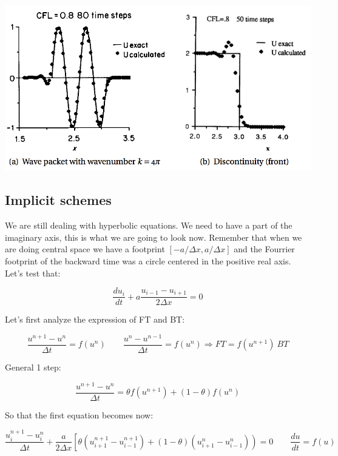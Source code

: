 \begin{center}
\includegraphics[scale=0.5]{ch3/13}
\end{center}

\subsection{Implicit schemes}
We are still dealing with hyperbolic equations. We need to have a part of the imaginary axis, this is what we are going to look now. Remember that when we are doing central space we have a footprint $[-a/\Delta x, a/\Delta x]$ and the Fourrier footprint of the backward time was a circle centered in the positive real axis. Let's test that: 

\begin{equation}
\frac{du_i}{dt} + a \frac{u_{i-1}-u_{i+1}}{2\Delta x} = 0
\end{equation}

Let's first analyze the expression of FT and BT: 

\begin{equation}
\frac{u^{n+1}- u^n}{\Delta t} = f(u^n) \qquad \frac{u^{n}- u^{n-1}}{\Delta t} = f(u^n) \Rightarrow FT = f(u^{n+1})\ BT
\end{equation}

General 1 step: 

\begin{equation}
\frac{u^{n+1}-u^n}{\Delta t} = \theta f(u^{n+1}) + (1-\theta)f(u^n)
\end{equation}

So that the first equation becomes now:

\begin{equation}
\frac{u_i^{n+1}-u_i^n}{\Delta t} + \frac{a}{2\Delta x} \left[ \theta (u_{i+1}^{n+1}-u_{i-1}^{n+1})+ (1-\theta )(u_{i+1}^n - u_{i-1}^n)  \right) = 0 \qquad \frac{du}{dt} = f(u)
\end{equation}


